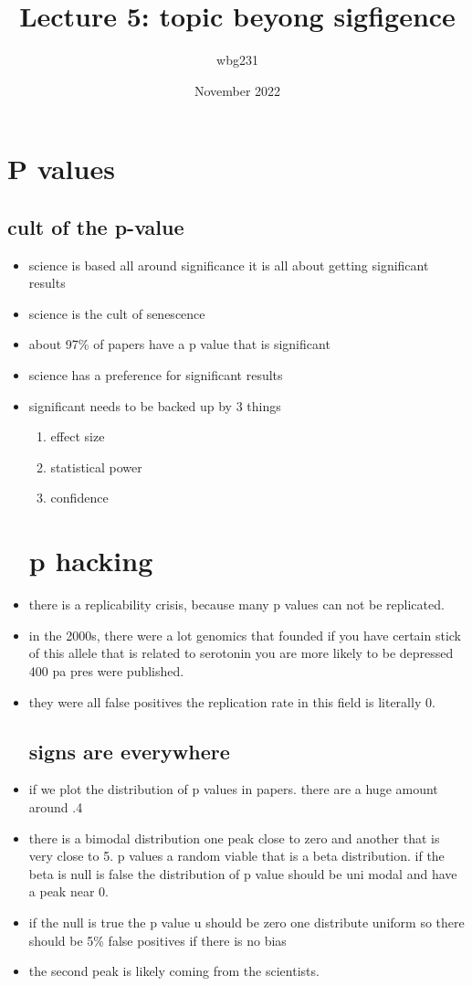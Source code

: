 \documentclass{article}
\title{Lecture 5: topic beyong sigfigence}
\author{wbg231 }
\date{November 2022}
\begin{document}
\maketitle

\section{P values}
\subsection{cult of the p-value}
\begin{itemize}
\item science is based all around significance it is all about getting significant results
\item science is the cult of senescence
\item about 97\% of papers have a p value that is significant 
\item science has a preference for significant results 
\item significant needs to be backed up by 3 things
\begin{enumerate}
    \item effect size 
    \item statistical power
    \item confidence 
\end{enumerate}
\section{ p hacking }
\item there is a replicability crisis, because many p values can not be replicated.
\item in the 2000s, there were a lot genomics that founded if you have  certain stick of this allele that is related to serotonin you are more likely to be depressed 400 pa pres were published.
\item  they were all false positives the replication rate in this field is literally 0.
\subsection{signs are everywhere}
\item if we plot the distribution of p values in papers. there are a huge amount around .4 
\item there is a bimodal distribution one peak close to zero and another that is very close to 5. p values a random viable that is a beta distribution. if the beta is null is false the distribution of p value should be uni modal and have a peak near 0. 
\item  if the null is true the p value u should be zero one distribute uniform so there should be 5\% false positives if there is no bias
\item the second peak is likely coming from the scientists. 

\end{itemize}
\end{document}
